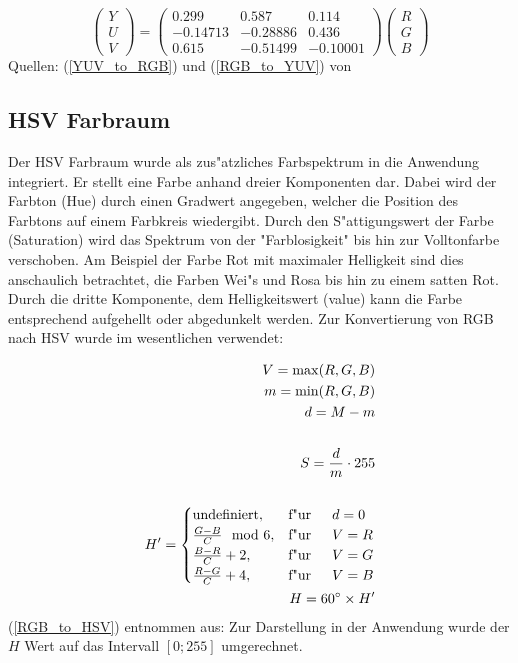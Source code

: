 \documentclass[a4paper]{article}
\begin{document}
\begin{equation}
\label{RGB_to_YUV}
\begin{pmatrix} Y \\ U \\ V\end{pmatrix} = 
\begin{pmatrix} 
	0.299 & 0.587 & 0.114 \\ 
	-0.14713 & -0.28886 & 0.436 \\
	0.615 & -0.51499 & -0.10001
\end{pmatrix}
\begin{pmatrix}R \\ G \\ B\end{pmatrix}
\end{equation}
Quellen: (\ref{YUV_to_RGB}) und (\ref{RGB_to_YUV}) von \cite{YUVPage}\newline


\subsection{HSV Farbraum}
Der HSV Farbraum wurde als zus"atzliches Farbspektrum in die Anwendung integriert. Er stellt eine Farbe
anhand dreier Komponenten dar. Dabei wird der Farbton (Hue) durch einen Gradwert angegeben, welcher die Position des
Farbtons auf einem Farbkreis wiedergibt. Durch den S"attigungswert der Farbe (Saturation) wird das Spektrum
von der "Farblosigkeit" bis hin zur Volltonfarbe verschoben. Am Beispiel der Farbe Rot mit maximaler Helligkeit sind dies anschaulich betrachtet, die Farben Wei"s und Rosa bis hin zu einem satten Rot. Durch die dritte Komponente, dem Helligkeitswert (value) kann die Farbe entsprechend aufgehellt oder abgedunkelt werden.
Zur Konvertierung von RGB nach HSV wurde im wesentlichen verwendet:

\begin{equation}
	\label{RGB_to_HSV}
	\begin{split}
	V = \max(R,G,B)\\
	m = \min(R,G,B)\\
	d = M - m\\
	\\
	S = \frac{d}{m} \cdot 255\\
	\\
	H^\prime = \begin{cases}
		\text{undefiniert}, 	& \text{f"ur}\indent d = 0\\
		\frac{G-B}{C} \mod 6, 	& \text{f"ur}\indent V = R\\
		\frac{B-R}{C} + 2, 	& \text{f"ur}\indent V = G\\
		\frac{R-G}{C} + 4, 	& \text{f"ur}\indent V = B
		\end{cases}
		\\
	H = 60^\circ \times H^\prime
	\end{split}
\end{equation}
(\ref{RGB_to_HSV}) entnommen aus: \cite{HSVPage}\newline
Zur Darstellung in der Anwendung wurde der $H$ Wert auf das Intervall $[0;255]$ umgerechnet.\newline
\end{document}
